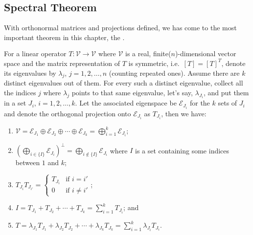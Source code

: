 \subsection{Spectral Theorem}
With orthonormal matrices and projections defined, we has come to the most important theorem in this chapter, the .
\begin{thm}
\label{thm:spectral}
For a linear operator $T: \mathcal{V} \to \mathcal{V}$ where $\mathcal{V}$ is a real, finite($n$)-dimensional vector space and the matrix representation of $T$ is symmetric, i.e.\ $[T]=[T]^T$, denote its eigenvalues by $\lambda_j$, $j = 1,2,\ldots,n$ (counting repeated ones). Assume there are $k$ distinct eigenvalues out of them. For every such a distinct eigenvalue, collect all the indices $j$ where $\lambda_j$ points to that same eigenvalue, let's say, $\lambda_{J_i}$, and put them in a set $J_i$, $i = 1,2,\ldots,k$. Let the associated eigenspace be $\mathcal{E}_{J_i}$ for the $k$ sets of $J_i$ and denote the orthogonal projection onto $\mathcal{E}_{J_i}$ as $T_{J_i}$, then we have:
\begin{enumerate}[label=(\alph*)]
\item $\mathcal{V} = \mathcal{E}_{J_1} \oplus \mathcal{E}_{J_2} \oplus \cdots \oplus \mathcal{E}_{J_k} = \bigoplus_{i=1}^{k} \mathcal{E}_{J_i}$;
\item $(\bigoplus_{i \in \{I\}} \mathcal{E}_{J_i})^\perp = \bigoplus_{i \notin \{I\}} \mathcal{E}_{J_i}$ where $I$ is a set containing some indices between $1$ and $k$;
\item $T_{J_i} T_{J_{i'}} = 
\begin{cases}
T_{J_i} & \text{if $i = i'$} \\
0 & \text{if $i \neq i'$}
\end{cases}$;
\item $I = T_{J_1} + T_{J_2} + \cdots + T_{J_k} = \sum_{i=1}^{k} T_{J_i}$; and
\item $T = \lambda_{J_1}T_{J_1} + \lambda_{J_2}T_{J_2} + \cdots + \lambda_{J_k}T_{J_k} = \sum_{i=1}^{k} \lambda_{J_i}T_{J_i}$.
\end{enumerate}
\end{thm}
